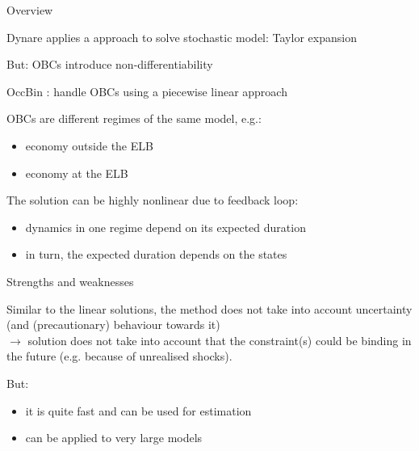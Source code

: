 

\begin{frame}{Overview}
    \begin{wideitemize}
    \item Dynare applies a  approach to solve stochastic model: Taylor expansion
	\item But: OBCs introduce non-differentiability
    \item OccBin \parencite{GuerrieriIacoviello2015}: handle OBCs using a piecewise linear approach
    \item OBCs are different regimes of the same model, e.g.:
    \begin{itemize}
        \item economy outside the ELB
        \item economy at the ELB
    \end{itemize}
    \item The solution can be highly nonlinear due to feedback loop:
	\begin{itemize}
		\item dynamics in one regime depend on its expected duration
		\item in turn, the expected duration depends on the states
		\end{itemize}
    \end{wideitemize}
\end{frame}


\begin{frame}{Strengths and weaknesses}
    \begin{wideitemize}
	\item Similar to the linear solutions, the method does not take into account uncertainty (and (precautionary) behaviour towards it)\\
	$\rightarrow$ solution does not take into account that the constraint(s) could be binding in the future (e.g. because of unrealised shocks).
	\item But:
	\begin{itemize}
		\item it is quite fast and can be used for estimation
		\item can be applied to very large models
	\end{itemize}
    \end{wideitemize}
\end{frame}

